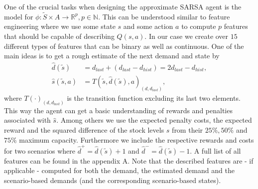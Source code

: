 \documentclass[journal, a4paper]{IEEEtran}
\theoremstyle{plain}
\theoremstyle{definition}
\begin{document}
One of the crucial tasks when designing the approximate SARSA agent is the model for $\phi: \tilde{S} \times A \rightarrow \mathbb{R}^p, p \in \mathbb{N}$. This can be understood similar to feature engineering where we use some state $s$ and some action $a$ to compute $p$ features that should be capable of describing $Q(s,a)$. In our case we create over $15$ different types of features that can be binary as well as continuous. One of the main ideas is to get a rough estimate of the next demand and state by
\begin{equation}
	\begin{split}
		\hat{d}(\tilde{s})&= d_{last} + \left( d_{last} - d_{hist} \right) = 2d_{last} - d_{hist}, \\
		\hat{s}(\tilde{s}, a) &= T(\tilde{s}, \hat{d}(\tilde{s}), a)_{(d, d_{last})},
	\end{split}
\end{equation}
where $T(\cdot)_{(d, d_{last})}$ is the transition function excluding its last two elements. This way the agent can get a basic understanding of rewards and penalties associated with $\hat{s}$. Among others we use the expected penalty costs, the expected reward and the squared difference of the stock levels $s$ from their $25\%, 50\%$ and $75\% $ maximum capacity. Furthermore we include the respective rewards and costs for two scenarios where $\hat{d}^+=\hat{d}(\tilde{s}) + 1$ and $\hat{d}^-=\hat{d}(\tilde{s})  - 1$. %
A full list of all features can be found in the appendix A. Note that the described features are - if applicable - computed for both the demand, the estimated demand and the scenario-based demands (and the corresponding scenario-based states). \newline
\end{document}

